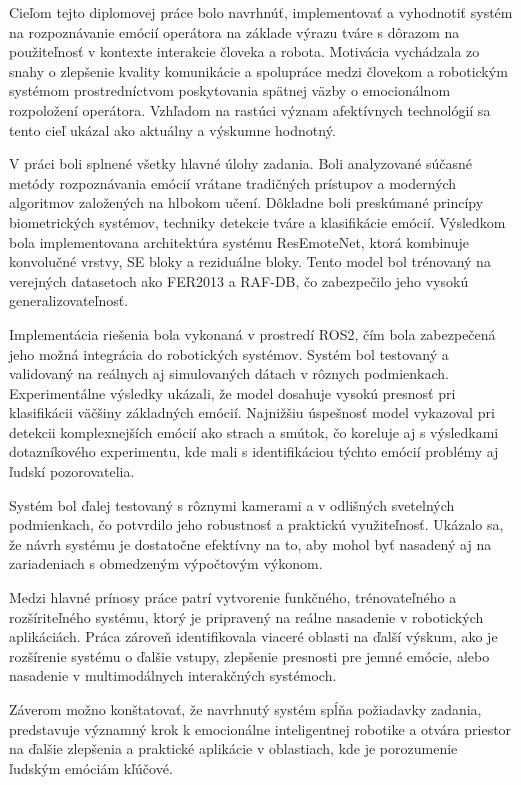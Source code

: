 Cieľom tejto diplomovej práce bolo navrhnúť, implementovať a vyhodnotiť systém na rozpoznávanie emócií operátora na základe výrazu tváre s dôrazom na použiteľnosť v kontexte interakcie človeka a robota. Motivácia vychádzala zo snahy o zlepšenie kvality komunikácie a spolupráce medzi človekom a robotickým systémom prostredníctvom poskytovania spätnej väzby o emocionálnom rozpoložení operátora. Vzhľadom na rastúci význam afektívnych technológií sa tento cieľ ukázal ako aktuálny a výskumne hodnotný.

V práci boli splnené všetky hlavné úlohy zadania. Boli analyzované súčasné metódy rozpoznávania emócií vrátane tradičných prístupov a moderných algoritmov založených na hlbokom učení. Dôkladne boli preskúmané princípy biometrických systémov, techniky detekcie tváre a klasifikácie emócií. Výsledkom bola implementovana architektúra systému ResEmoteNet, ktorá kombinuje konvolučné vrstvy, SE bloky a reziduálne bloky. Tento model bol trénovaný na verejných datasetoch ako FER2013 a RAF-DB, čo zabezpečilo jeho vysokú generalizovateľnosť.

Implementácia riešenia bola vykonaná v prostredí ROS2, čím bola zabezpečená jeho možná integrácia do robotických systémov. Systém bol testovaný a validovaný na reálnych aj simulovaných dátach v rôznych podmienkach. Experimentálne výsledky ukázali, že model dosahuje vysokú presnosť pri klasifikácii väčšiny základných emócií. Najnižšiu úspešnosť model vykazoval pri detekcii komplexnejších emócií ako strach a smútok, čo koreluje aj s výsledkami dotazníkového experimentu, kde mali s identifikáciou týchto emócií problémy aj ľudskí pozorovatelia.

Systém bol ďalej testovaný s rôznymi kamerami a v odlišných svetelných podmienkach, čo potvrdilo jeho robustnosť a praktickú využiteľnosť. Ukázalo sa, že návrh systému je dostatočne efektívny na to, aby mohol byť nasadený aj na zariadeniach s obmedzeným výpočtovým výkonom.

Medzi hlavné prínosy práce patrí vytvorenie funkčného, trénovateľného a rozšíriteľného systému, ktorý je pripravený na reálne nasadenie v robotických aplikáciách. Práca zároveň identifikovala viaceré oblasti na ďalší výskum, ako je rozšírenie systému o ďalšie vstupy, zlepšenie presnosti pre jemné emócie, alebo nasadenie v multimodálnych interakčných systémoch.

Záverom možno konštatovať, že navrhnutý systém spĺňa požiadavky zadania, predstavuje významný krok k emocionálne inteligentnej robotike a otvára priestor na ďalšie zlepšenia a praktické aplikácie v oblastiach, kde je porozumenie ľudským emóciám kľúčové.